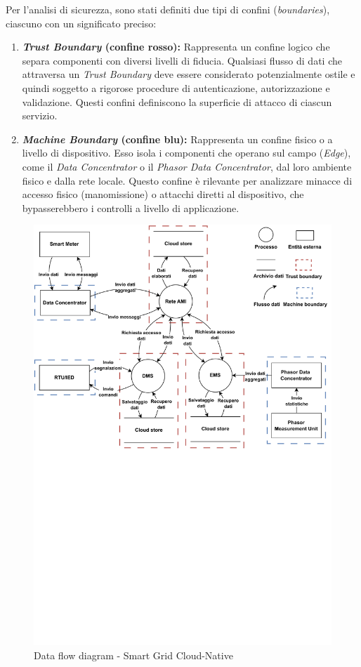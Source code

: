 Per l'analisi di sicurezza, sono stati definiti due tipi di confini (\textit{boundaries}), ciascuno con un significato preciso:

\begin{enumerate}
    \item \textbf{\textit{Trust Boundary} (confine rosso):} Rappresenta un confine logico che separa componenti con diversi livelli di fiducia. Qualsiasi flusso di dati che attraversa un \textit{Trust Boundary} deve essere considerato potenzialmente ostile e quindi soggetto a rigorose procedure di autenticazione, autorizzazione e validazione. Questi confini definiscono la superficie di attacco di ciascun servizio.
    \item \textbf{\textit{Machine Boundary} (confine blu):} Rappresenta un confine fisico o a livello di dispositivo. Esso isola i componenti che operano sul campo (\textit{Edge}), come il \textit{Data Concentrator} o il \textit{Phasor Data Concentrator}, dal loro ambiente fisico e dalla rete locale. Questo confine è rilevante per analizzare minacce di accesso fisico (manomissione) o attacchi diretti al dispositivo, che bypasserebbero i controlli a livello di applicazione.
\end{enumerate}




\begin{figure}[!h]
    \centering
    \includegraphics[trim= 0cm 39cm 0cm 0cm, clip, width=0.8\linewidth]{img/DFD.drawio-v2.drawio.pdf}
    \caption{Data flow diagram - Smart Grid Cloud-Native}
    \label{fig:DFD}
\end{figure}


